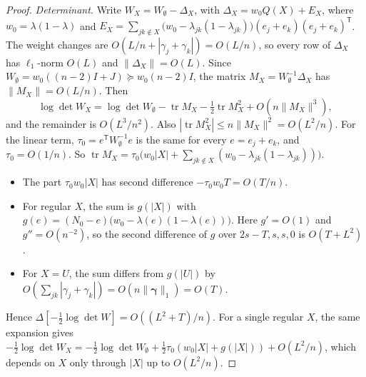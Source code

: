 \documentclass[11pt]{article}
\begin{document}
\begin{proof}
\emph{Determinant.}
Write \(W_X=W_\emptyset-\varDelta_X\), with
\(\varDelta_X=w_0Q(X)+E_X\), where \(w_0=\lambda(1-\lambda)\) and
\(E_X=\sum_{jk\notin X}\bigl(w_0-\lambda_{jk}(1-\lambda_{jk})\bigr)(e_j+e_k)(e_j+e_k)^{\mathsf T}\).
The weight changes are \(O(L/n+|\gamma_j+\gamma_k|)=O(L/n)\), so every row of
\(\varDelta_X\) has \(\ell_1\)-norm \(O(L)\) and \(\|\varDelta_X\|=O(L)\).
Since \(W_\emptyset=w_0((n-2)I+J)\succeq w_0(n-2)I\), the matrix
\(M_X=W_\emptyset^{-1}\varDelta_X\) has \(\|M_X\|=O(L/n)\). Then
\[
\log\det W_X=\log\det W_\emptyset-\operatorname{tr}M_X-\tfrac12\operatorname{tr}M_X^2
+O(n\|M_X\|^3),
\]
and the remainder is \(O(L^3/n^2)\).
Also \(|\operatorname{tr}M_X^2|\le n\|M_X\|^2=O(L^2/n)\).
For the linear term, \(\tau_0=e^{\mathsf T}W_\emptyset^{-1}e\) is the same for
every \(e=e_j+e_k\), and \(\tau_0=O(1/n)\). So
\(\operatorname{tr}M_X=\tau_0\bigl(w_0|X|+\sum_{jk\notin X}(w_0-\lambda_{jk}(1-\lambda_{jk}))\bigr)\).
\begin{itemize}
\item The part \(\tau_0w_0|X|\) has second difference \(-\tau_0w_0T=O(T/n)\).
\item For regular \(X\), the sum is \(g(|X|)\) with
\(g(e)=(N_0-e)\bigl(w_0-\lambda(e)(1-\lambda(e))\bigr)\). Here
\(g'=O(1)\) and \(g''=O(n^{-2})\), so the second difference of
\(g\) over \(2s-T,s,s,0\) is \(O(T+L^2)\).
\item For \(X=U\), the sum differs from \(g(|U|)\) by
\(O(\sum_{jk}|\gamma_j+\gamma_k|)=O(n\|\boldsymbol\gamma\|_1)=O(T)\).
\end{itemize}
Hence \(\Delta[-\frac12\log\det W]=O((L^2+T)/n)\).
For a single regular \(X\), the same expansion gives
\(-\frac12\log\det W_X=-\frac12\log\det W_\emptyset+\frac12\tau_0(w_0|X|+g(|X|))+O(L^2/n)\),
which depends on \(X\) only through \(|X|\) up to \(O(L^2/n)\).


\end{proof}
\end{document}
